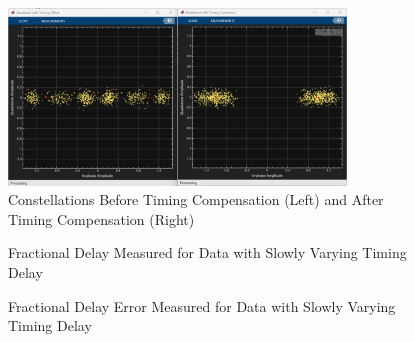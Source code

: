 \documentclass{article}
\begin{document}
\begin{figure}[H]
	\centerline{\includegraphics[width=0.8\textwidth]{constellations_with_timing_correction.png}}
	\caption{Constellations Before Timing Compensation (Left) and After Timing Compensation (Right)}
	\label{fig::constellations_with_timing_correction}
\end{figure}

\begin{figure}[H]
	\centerline{}
	\caption{Fractional Delay Measured for Data with Slowly Varying Timing Delay}
	\label{fig::fractional_delay_timing_offset}
\end{figure}

\begin{figure}[H]
	\centerline{}
	\caption{Fractional Delay Error Measured for Data with Slowly Varying Timing Delay}
	\label{fig::fractional_delay_error_timing_offset}
\end{figure}
\end{document}

